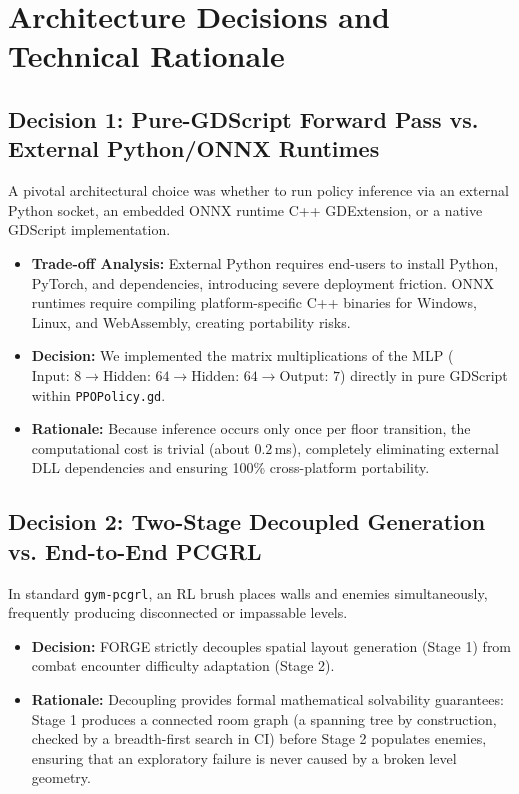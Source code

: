 \section{Architecture Decisions and Technical Rationale}

\subsection{Decision 1: Pure-GDScript Forward Pass vs. External Python/ONNX Runtimes}
A pivotal architectural choice was whether to run policy inference via an external Python socket, an embedded ONNX runtime C++ GDExtension, or a native GDScript implementation.
\begin{itemize}
    \item \textbf{Trade-off Analysis:} External Python requires end-users to install Python, PyTorch, and dependencies, introducing severe deployment friction. ONNX runtimes require compiling platform-specific C++ binaries for Windows, Linux, and WebAssembly, creating portability risks.
    \item \textbf{Decision:} We implemented the matrix multiplications of the MLP ($\text{Input: 8} \rightarrow \text{Hidden: 64} \rightarrow \text{Hidden: 64} \rightarrow \text{Output: 7}$) directly in pure GDScript within \texttt{PPOPolicy.gd}.
    \item \textbf{Rationale:} Because inference occurs only once per floor transition, the computational cost is trivial (about $0.2$\,ms), completely eliminating external DLL dependencies and ensuring 100\% cross-platform portability.
\end{itemize}

\subsection{Decision 2: Two-Stage Decoupled Generation vs. End-to-End PCGRL}
In standard \texttt{gym-pcgrl}, an RL brush places walls and enemies simultaneously, frequently producing disconnected or impassable levels.
\begin{itemize}
    \item \textbf{Decision:} FORGE strictly decouples spatial layout generation (Stage 1) from combat encounter difficulty adaptation (Stage 2).
    \item \textbf{Rationale:} Decoupling provides formal mathematical solvability guarantees: Stage 1 produces a connected room graph (a spanning tree by construction, checked by a breadth-first search in CI) before Stage 2 populates enemies, ensuring that an exploratory failure is never caused by a broken level geometry.
\end{itemize}

